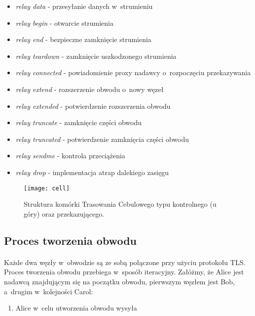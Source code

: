 \begin{itemize}
\setlength\itemsep{0mm}
 \item \textit{relay data} - przesyłanie danych w~strumieniu
 \item \textit{relay begin} - otwarcie strumienia
 \item \textit{relay end} - bezpieczne zamknięcie strumienia
 \item \textit{relay teardown} - zamknięcie uszkodzonego strumienia
 \item \textit{relay connected} - powiadomienie proxy nadawcy o~rozpoczęciu przekazywania
 \item \textit{relay extend} - rozszerzenie obwodu o~nowy węzeł
 \item \textit{relay extended} - potwierdzenie rozszerzenia obwodu
 \item \textit{relay truncate} - zamknięcie części obwodu
 \item \textit{relay truncated} - potwierdzenie zamknięcia części obwodu
 \item \textit{relay sendme} - kontrola przeciążenia
 \item \textit{relay drop} - implementacja atrap dalekiego zasięgu
\end{itemize}

\begin{figure}
 \centering
 \texttt{[image: cell]}
 \caption[Caption for LOR]{Struktura komórki Trasowania Cebulowego typu kontrolnego (u góry) oraz przekazującego.\footnotemark}
 \label{rys:cell}
\end{figure}

\subsection{Proces tworzenia obwodu}\paragraph{}
Każde dwa węzły w~obwodzie są ze sobą połączone przy użyciu protokołu TLS. Proces tworzenia obwodu przebiega w~sposób iteracyjny. Załóżmy, że Alice jest nadawcą znajdującym się na początku obwodu, pierwszym węzłem jest Bob, a~drugim w~kolejności Carol:
\begin{enumerate}
 \item Alice w~celu utworzenia obwodu wysyła 
\end{enumerate}


\subsection{}